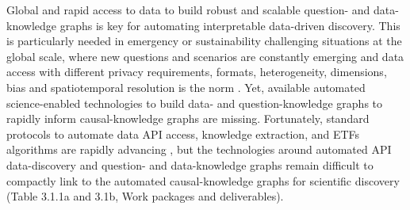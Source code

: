\documentclass[11pt, a4paper]{article} %
\begin{document}
      Global and rapid access to data to build robust and scalable
      question- and data-knowledge graphs is key for automating
      interpretable data-driven discovery. This is particularly needed
      in emergency or sustainability challenging situations at the
      global scale, where new questions and scenarios are constantly
      emerging and data access with different privacy requirements,
      formats, heterogeneity, dimensions, bias and spatiotemporal
      resolution is the norm
      \citep{Openstreetmap,Bluecloud,HOT,Elixir}. Yet, available
      automated science-enabled technologies to build data- and
      question-knowledge graphs to rapidly inform causal-knowledge
      graphs are missing. Fortunately, standard protocols to automate
      data API access, knowledge extraction, and ETFs algorithms are
      rapidly advancing
      \citep{Fan2012,APISGURU,OpenKnowledgeFoundation}, but the
      technologies around automated API data-discovery and question-
      and data-knowledge graphs remain difficult to compactly link to
      the automated causal-knowledge graphs for scientific discovery
      (Table 3.1.1a and 3.1b, Work packages and deliverables).
      
\end{document}
